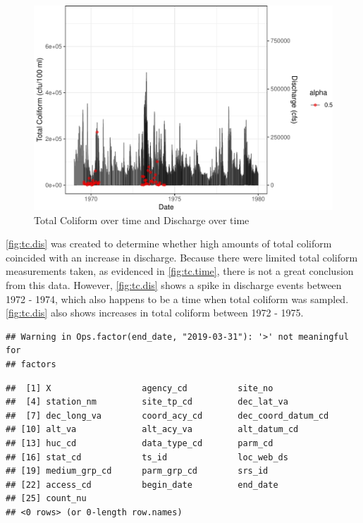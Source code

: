 \documentclass[12pt,]{article}
\newenvironment{Shaded}{\begin{snugshade}}{\end{snugshade}}
\newcommand{\CommentTok}[1]{\textcolor[rgb]{0.56,0.35,0.01}{\textit{#1}}}
\newcommand{\KeywordTok}[1]{\textcolor[rgb]{0.13,0.29,0.53}{\textbf{#1}}}
\newcommand{\NormalTok}[1]{#1}
\newcommand{\OperatorTok}[1]{\textcolor[rgb]{0.81,0.36,0.00}{\textbf{#1}}}
\newcommand{\StringTok}[1]{\textcolor[rgb]{0.31,0.60,0.02}{#1}}
\begin{document}
\begin{figure}
\centering
\includegraphics{Project_Template_files/figure-latex/tc.dis-1.pdf}
\caption{\label{fig:tc.dis}Total Coliform over time and Discharge over
time}
\end{figure}

\autoref{fig:tc.dis} was created to determine whether high amounts of
total coliform coincided with an increase in discharge. Because there
were limited total coliform measurements taken, as evidenced in
\autoref{fig:tc.time}, there is not a great conclusion from this data.
However, \autoref{fig:tc.dis} shows a spike in discharge events between
1972 - 1974, which also happens to be a time when total coliform was
sampled. \autoref{fig:tc.dis} also shows increases in total coliform
between 1972 - 1975.

\begin{Shaded}
\end{Shaded}

\begin{verbatim}
## Warning in Ops.factor(end_date, "2019-03-31"): '>' not meaningful for
## factors
\end{verbatim}

\begin{verbatim}
##  [1] X                  agency_cd          site_no           
##  [4] station_nm         site_tp_cd         dec_lat_va        
##  [7] dec_long_va        coord_acy_cd       dec_coord_datum_cd
## [10] alt_va             alt_acy_va         alt_datum_cd      
## [13] huc_cd             data_type_cd       parm_cd           
## [16] stat_cd            ts_id              loc_web_ds        
## [19] medium_grp_cd      parm_grp_cd        srs_id            
## [22] access_cd          begin_date         end_date          
## [25] count_nu          
## <0 rows> (or 0-length row.names)
\end{verbatim}
\end{document}
